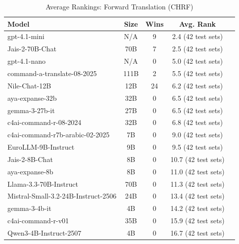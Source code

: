 \begin{table}[htbp]
\centering
\caption{Average Rankings: Forward Translation (CHRF)}
\label{tab:avg_rankings_chrf}
\begin{tabular}{l@{\hspace{3pt}}c@{\hspace{3pt}}c@{\hspace{3pt}}c@{\hspace{3pt}}c}
\toprule
Model & Size & Wins & Avg. Rank \\
\midrule
gpt-4.1-mini & N/A & 9 & 2.4 (42 test sets) \\
Jais-2-70B-Chat & 70B & 7 & 2.5 (42 test sets) \\
gpt-4.1-nano & N/A & 0 & 5.0 (42 test sets) \\
command-a-translate-08-2025 & 111B & 2 & 5.5 (42 test sets) \\
Nile-Chat-12B & 12B & 24 & 6.2 (42 test sets) \\
aya-expanse-32b & 32B & 0 & 6.5 (42 test sets) \\
gemma-3-27b-it & 27B & 0 & 6.5 (42 test sets) \\
c4ai-command-r-08-2024 & 32B & 0 & 6.8 (42 test sets) \\
c4ai-command-r7b-arabic-02-2025 & 7B & 0 & 9.0 (42 test sets) \\
EuroLLM-9B-Instruct & 9B & 0 & 9.5 (42 test sets) \\
Jais-2-8B-Chat & 8B & 0 & 10.7 (42 test sets) \\
aya-expanse-8b & 8B & 0 & 11.0 (42 test sets) \\
Llama-3.3-70B-Instruct & 70B & 0 & 11.3 (42 test sets) \\
Mistral-Small-3.2-24B-Instruct-2506 & 24B & 0 & 13.4 (42 test sets) \\
gemma-3-4b-it & 4B & 0 & 14.2 (42 test sets) \\
c4ai-command-r-v01 & 35B & 0 & 15.9 (42 test sets) \\
Qwen3-4B-Instruct-2507 & 4B & 0 & 16.7 (42 test sets) \\
\bottomrule
\end{tabular}
\end{table}